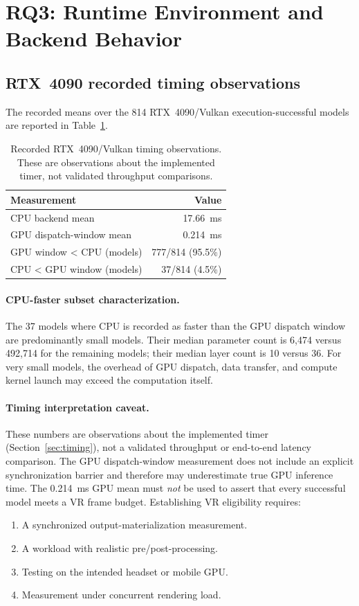 \documentclass[10pt,twocolumn,letterpaper]{article}
\begin{document}
\section{RQ3: Runtime Environment and Backend Behavior}\label{sec:rq3}

\subsection{RTX~4090 recorded timing observations}

The recorded means over the 814 RTX~4090/Vulkan execution-successful models are reported in Table~\ref{tab:runtime}.

\begin{table}[t]
\centering\small
\begin{tabular}{lr}
\toprule
Measurement & Value \\
\midrule
CPU backend mean & 17.66~ms \\
GPU dispatch-window mean & 0.214~ms \\
GPU window < CPU (models) & 777/814 (95.5\%) \\
CPU < GPU window (models) & 37/814 (4.5\%) \\
\bottomrule
\end{tabular}
\caption{Recorded RTX~4090/Vulkan timing observations. These are observations about the implemented timer, not validated throughput comparisons.}
\label{tab:runtime}
\end{table}

\paragraph{CPU-faster subset characterization.}
The 37 models where CPU is recorded as faster than the GPU dispatch window are predominantly small models. Their median parameter count is 6,474 versus 492,714 for the remaining models; their median layer count is 10 versus 36. For very small models, the overhead of GPU dispatch, data transfer, and compute kernel launch may exceed the computation itself.

\paragraph{Timing interpretation caveat.}
These numbers are observations about the implemented timer (Section~\ref{sec:timing}), not a validated throughput or end-to-end latency comparison. The GPU dispatch-window measurement does not include an explicit synchronization barrier and therefore may underestimate true GPU inference time. The 0.214~ms GPU mean must \emph{not} be used to assert that every successful model meets a VR frame budget. Establishing VR eligibility requires:
\begin{enumerate}[nosep,leftmargin=*]
  \item A synchronized output-materialization measurement.
  \item A workload with realistic pre/post-processing.
  \item Testing on the intended headset or mobile GPU.
  \item Measurement under concurrent rendering load.
\end{enumerate}
\end{document}
